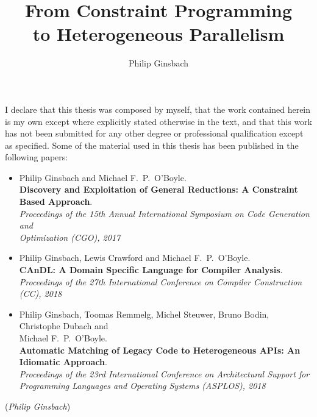 \documentclass[phd,icsa,twoside,logo,11pt]{infthesis}
\title{From Constraint Programming\\to Heterogeneous Parallelism}
\author{Philip Ginsbach}
\begin{document}
\begin{preliminary}
\maketitle
\begin{acknowledgements}

\end{acknowledgements}
\begin{declaration}
    I declare that this thesis was composed by myself, that the work contained
    herein is my own except where explicitly stated otherwise in the text, and
    that this work has not been submitted for any other degree or professional
    qualification except as specified.
    Some of the material used in this thesis has been published in the following
    papers:

    \begin{itemize}
    \small
        \item Philip Ginsbach and Michael F.\ P.\ O'Boyle.\\
              {\bf Discovery and Exploitation of General Reductions: A
              Constraint Based Approach}.\\
              {\em Proceedings of the 15th Annual International
               Symposium on Code Generation and\\Optimization (CGO), 2017}
        \item Philip Ginsbach, Lewis Crawford and Michael F.\ P.\ O'Boyle.\\
              {\bf CAnDL: A Domain Specific Language for Compiler Analysis}.\\
              {\em Proceedings of the 27th International Conference on
               Compiler Construction (CC), 2018}
        \item Philip Ginsbach, Toomas Remmelg, Michel Steuwer, Bruno Bodin,
              Christophe Dubach and\\Michael F.\ P.\ O'Boyle.\\
              {\bf Automatic Matching of Legacy Code to Heterogeneous APIs: An
              Idiomatic Approach}.\\
              {\em Proceedings of the 23rd International Conference on
               Architectural Support for\\Programming Languages and Operating
               Systems (ASPLOS), 2018}
    \end{itemize}

    \par
\vspace{1in}\raggedleft({\em Philip Ginsbach})
\end{declaration}
\tableofcontents
\end{preliminary}
\end{document}
